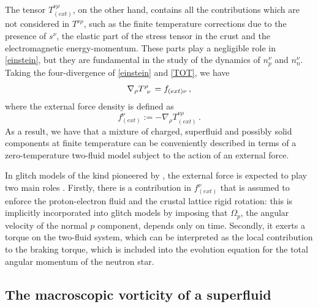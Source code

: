 \documentclass[usenatbib%
]{mnras}
\begin{document}
The tensor $T_{(ext)}^{\nu \rho}$, on the other hand, contains all the contributions which are not considered in $T^{\nu \rho}$, such as the finite temperature corrections due to the presence of $s^\nu$, the elastic part of the stress tensor in the crust and the electromagnetic energy-momentum. These parts play a negligible role in \eqref{einstein}, but they are fundamental in the study of the dynamics of $n^\nu_p$ and $n_n^\nu$. 
Taking the four-divergence of \eqref{einstein} and \eqref{TOT}, 
we have
\begin{equation}\label{BbBbalance}
\nabla_\rho T\indices{^\rho _\nu} = f_{(ext)\nu} \, ,
\end{equation}
where  the external force density is defined as
\begin{equation}
f_{(ext)}^\nu := -\nabla_\rho T^{\nu \rho}_{(ext)} \, .
\end{equation}  
As a result, we have that a mixture of charged, superfluid and possibly solid components at finite temperature can be conveniently described in terms of a zero-temperature two-fluid model subject to the action of an external force. 

In glitch models of the kind pioneered by \cite{baym+1969}, the external force is expected to play two main roles \citep[see e.g. the discussion in ][]{antonellipizzochero2017}. 
Firstly, there is a contribution in $f^\nu_{(ext)}$ that is assumed to enforce the proton-electron fluid and the crustal lattice rigid rotation: this is implicitly incorporated into glitch models by imposing that $\Omega_p$, the angular velocity of the normal $p$ component, depends only on time. 
Secondly, it exerts a torque on the two-fluid system, which can be interpreted as the local contribution to the braking torque, which is included into the evolution equation for the total angular momentum of the neutron star.  

\subsection{The macroscopic vorticity of a superfluid}\label{superfluids}
\end{document}
